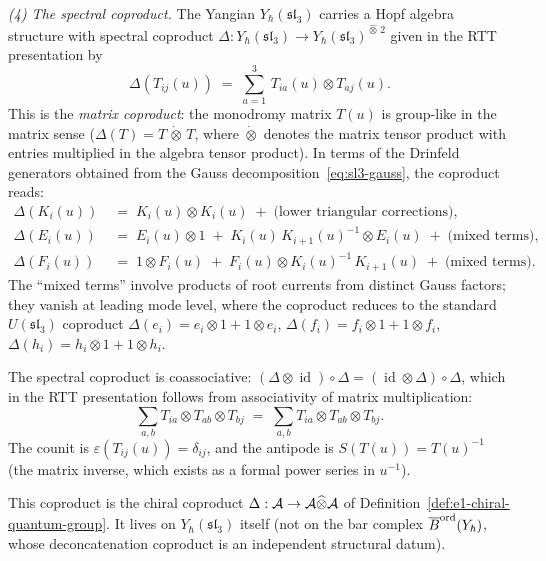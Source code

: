 \begin{example}
\medskip
\noindent\emph{(4) The spectral coproduct.}
The Yangian $Y_\hbar(\mathfrak{sl}_3)$ carries a Hopf algebra
structure with spectral coproduct
$\Delta : Y_\hbar(\mathfrak{sl}_3) \to
Y_\hbar(\mathfrak{sl}_3)^{\widehat\otimes\, 2}$ given in the
RTT presentation by
\begin{equation}\label{eq:sl3-coproduct-rtt}
\Delta(T_{ij}(u))
\;=\;
\sum_{a=1}^{3}\,T_{ia}(u)\otimes T_{aj}(u).
\end{equation}
This is the \emph{matrix coproduct}: the monodromy matrix
$T(u)$ is group-like in the matrix sense
($\Delta(T) = T\,\dot\otimes\,T$, where $\dot\otimes$ denotes
the matrix tensor product with entries multiplied in the
algebra tensor product). In terms of the Drinfeld generators
obtained from the Gauss decomposition~\eqref{eq:sl3-gauss},
the coproduct reads:
\begin{align}
\Delta(K_i(u))
&\;=\;
K_i(u)\otimes K_i(u)
\;+\;\text{(lower triangular corrections)},
\label{eq:sl3-coprod-K}\\[3pt]
\Delta(E_i(u))
&\;=\;
E_i(u)\otimes 1
\;+\;
K_i(u)\,K_{i+1}(u)^{-1}\otimes E_i(u)
\;+\;\text{(mixed terms)},
\label{eq:sl3-coprod-E}\\[3pt]
\Delta(F_i(u))
&\;=\;
1\otimes F_i(u)
\;+\;
F_i(u)\otimes K_i(u)^{-1}\,K_{i+1}(u)
\;+\;\text{(mixed terms)}.
\label{eq:sl3-coprod-F}
\end{align}
The ``mixed terms'' involve products of root currents
from distinct Gauss factors; they vanish at leading
mode level, where the coproduct reduces to the
standard $U(\mathfrak{sl}_3)$ coproduct
$\Delta(e_i) = e_i\otimes 1 + 1\otimes e_i$,
$\Delta(f_i) = f_i\otimes 1 + 1\otimes f_i$,
$\Delta(h_i) = h_i\otimes 1 + 1\otimes h_i$.

The spectral coproduct is coassociative:
$(\Delta\otimes\operatorname{id})\circ\Delta
= (\operatorname{id}\otimes\Delta)\circ\Delta$,
which in the RTT presentation follows from associativity of
matrix multiplication:
\[
\sum_{a,b}T_{ia}\otimes T_{ab}\otimes T_{bj}
\;=\;
\sum_{a,b}T_{ia}\otimes T_{ab}\otimes T_{bj}.
\]
The counit is $\varepsilon(T_{ij}(u)) = \delta_{ij}$,
and the antipode is $S(T(u)) = T(u)^{-1}$
(the matrix inverse, which exists as a formal power series
in $u^{-1}$).

This coproduct is the chiral coproduct
$\Delta: \mathcal{A}\to\mathcal{A}\widehat\otimes\mathcal{A}$ of
Definition~\ref{def:e1-chiral-quantum-group}.
It lives on $Y_\hbar(\mathfrak{sl}_3)$ itself (not on the
bar complex $\overline{B}^{\mathrm{ord}}(Y_\hbar)$, whose deconcatenation
coproduct is an independent structural datum).


\end{example}
